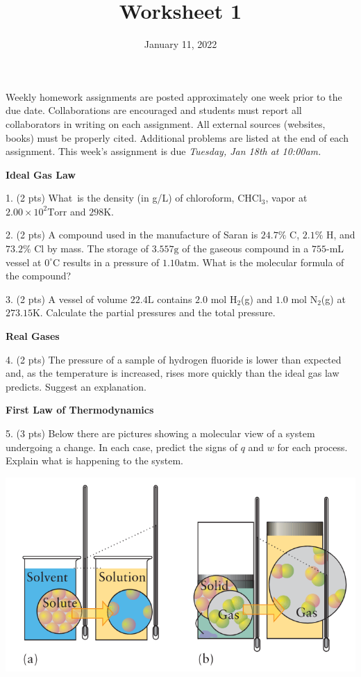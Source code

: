 \documentclass[11pt]{article}
\title{\textbf{Worksheet 1}}
\date{\vspace{-2em}January 11, 2022}
\begin{document}
\maketitle

Weekly homework assignments are posted approximately one week prior to the
due date. Collaborations are encouraged and students must report all collaborators
in writing on each assignment. All external sources (websites, books) must be
properly cited. Additional problems are listed at the end of each assignment.
This week's assignment is due \textit{Tuesday, Jan 18th at 10:00am.}

\textbf{Ideal Gas Law}

1. (2 pts) What\ is the density (in g/L) of chloroform, CHCl$_3$, vapor at
$2.00\times 10^2\text{Torr}$ and $298\text{K}$.

\vspace{1in}

2. (2 pts) A compound used in the manufacture of Saran is $24.7\%$ C, $2.1\%$ H, and
$73.2\%$ Cl by mass. The storage of $3.557\text{g}$ of the gaseous compound in
a $755$-mL vessel at $0^\circ\text{C}$ results in a pressure of $1.10\text{atm}$.
What is the molecular formula of the compound?


\vspace{1in}

3. (2 pts) A vessel of volume $22.4\text{L}$ contains $2.0$ mol H$_2$(g) and $1.0$ mol
N$_2$(g) at $273.15\text{K}$. Calculate the partial pressures and the total pressure.

\vspace{1in}

\textbf{Real Gases}

4. (2 pts) The pressure of a sample of hydrogen fluoride is lower than expected and, as the
temperature is increased, rises more quickly than the ideal gas law predicts.
Suggest an explanation.

\vspace{1in}

\textbf{First Law of Thermodynamics}

5. (3 pts) Below there are pictures showing a molecular view of a system
undergoing a change. In each case, predict the signs of $q$ and $w$ for
 each process. Explain what is happening to the system.

\begin{center}
  \includegraphics[scale=0.35]{phase_change.png}
\end{center}
\end{document}
